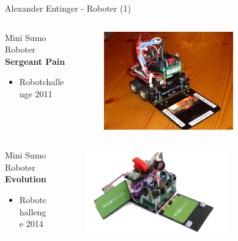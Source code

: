 \documentclass{beamer}
\begin{document}
\begin{frame}{Alexander Entinger - Roboter (1)}
	\begin{columns}
		\begin{column}{0.5\textwidth}
			\begin{large}Mini Sumo Roboter \textbf{Sergeant Pain}\end{large}
			\begin{itemize}
				\item Robotchallenge 2011
			\end{itemize}
		\end{column}
		\begin{column}{0.5\textwidth}
			\begin{figure}[H]
				\centering
				\includegraphics[width=0.7\textwidth]{./images/robot-sergeant-pain.jpg}
				\label{fig:robot-sergeant-pain}
			\end{figure}
		\end{column}
	\end{columns}
	
	\begin{columns}
		\begin{column}{0.5\textwidth}
			\begin{large}Mini Sumo Roboter \textbf{Evolution}\end{large}
			\begin{itemize}
				\item Robotchallenge 2014
			\end{itemize}
		\end{column}
		\begin{column}{0.5\textwidth}
			\begin{figure}[H]
				\centering
				\includegraphics[width=0.7\textwidth]{./images/robot-evolution.jpg}
				\label{fig:robot-evolution}
			\end{figure}
		\end{column}
	\end{columns}
\end{frame}
\end{document}

